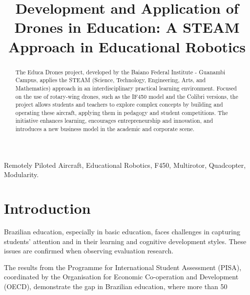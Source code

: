 \documentclass[conference]{IEEEtran}
\begin{document}
\title{Development and Application of Drones in Education: A STEAM Approach in Educational Robotics}


\maketitle

\begin{abstract}
The Educa Drones project, developed by the Baiano Federal Institute - Guanambi Campus, applies the STEAM (Science, Technology, Engineering, Arts, and Mathematics) approach in an interdisciplinary practical learning environment. Focused on the use of rotary-wing drones, such as the IF450 model and the Colibri versions, the project allows students and teachers to explore complex concepts by building and operating these aircraft, applying them in pedagogy and student competitions. The initiative enhances learning, encourages entrepreneurship and innovation, and introduces a new business model in the academic and corporate scene.
\end{abstract}

\begin{IEEEkeywords}
Remotely Piloted Aircraft, Educational Robotics, F450, Multirotor, Quadcopter, Modularity.
\end{IEEEkeywords}

\section{Introduction}

Brazilian education, especially in basic education, faces challenges in capturing students' attention and in their learning and cognitive development styles. These issues are confirmed when observing evaluation research.

The results from the Programme for International Student Assessment (PISA), coordinated by the Organisation for Economic Co-operation and Development (OECD), demonstrate the gap in Brazilian education, where more than 50%
\end{document}

